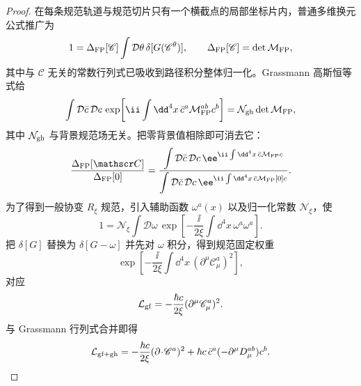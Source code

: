 \begin{proof}
在每条规范轨道与规范切片只有一个横截点的局部坐标片内，普通多维换元公式推广为
\begin{equation*}
 1=\Delta_{\rm FP}[\mathscr C]
 \int\mathcal D\theta\,\delta[G(\mathscr C^\theta)],
 \qquad
 \Delta_{\rm FP}[\mathscr C]=\det\mathcal M_{\rm FP},
\end{equation*}
其中与 $\mathscr C$ 无关的常数行列式已吸收到路径积分整体归一化。Grassmann 高斯恒等式给
\begin{equation*}
 \int\mathcal D\bar c\,\mathcal Dc\,
 \exp\!\left[
 \ii\int\dd^4x\,\bar c^a\mathcal M_{\rm FP}^{ab}c^b
 \right]
 =\mathcal N_{\rm gh}\det\mathcal M_{\rm FP},
\end{equation*}
其中 $\mathcal N_{\rm gh}$ 与背景规范场无关。把零背景值相除即可消去它：
\begin{equation*}
 \frac{\Delta_{\rm FP}[\mathscr C]}{\Delta_{\rm FP}[0]}
 =
 \frac{\displaystyle\int\mathcal D\bar c\,\mathcal Dc\,
 \ee^{\ii\int\dd^4x\,\bar c\mathcal M_{\rm FP}c}}
 {\displaystyle\int\mathcal D\bar c\,\mathcal Dc\,
 \ee^{\ii\int\dd^4x\,\bar c\mathcal M_{\rm FP}[0]c}}.
\end{equation*}
为了得到一般协变 $R_\xi$ 规范，引入辅助函数 $\omega^a(x)$ 以及归一化常数 $\mathcal N_\xi$，使
\begin{equation*}
 1=\mathcal N_\xi
 \int\mathcal D\omega\,
 \exp\!\left[-\frac{\ii}{2\xi}
 \int\dd^4x\,\omega^a\omega^a\right].
\end{equation*}
把 $\delta[G]$ 替换为 $\delta[G-\omega]$ 并先对 $\omega$ 积分，得到规范固定权重
\begin{equation*}
 \exp\!\left[-\frac{\ii}{2\xi}\int\dd^4x\,
 (\partial^\mu\mathscr C_\mu^a)^2\right],
\end{equation*}
对应
\begin{equation*}
 \mathcal L_{\rm gf}
 =-\frac{\hbar c}{2\xi}(\partial^\mu\mathscr C_\mu^a)^2.
\end{equation*}
与 Grassmann 行列式合并即得
\begin{equation*}
 \mathcal L_{\rm gf+gh}
 =-\frac{\hbar c}{2\xi}(\partial\!\cdot\!\mathscr C^a)^2
 +\hbar c\,\bar c^a(-\partial^\mu D_\mu^{ab})c^b.
\end{equation*}


\end{proof}
